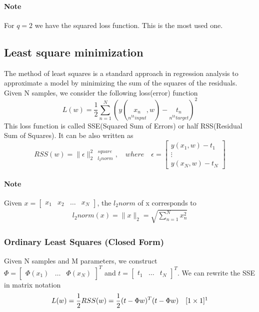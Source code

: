 \documentclass[../main.tex]{subfiles}
\begin{document}
\paragraph{Note} For $q=2$ we have the squared loss function. This is the most used one.

\subsection{Least square minimization}
The method of least squares is a standard approach in regression analysis to approximate a model by minimizing the sum of the squares of the residuals. Given N samples, we consider the following loss(error) function
\begin{equation}
    L(w)=\frac{1}{2}\sum_{n=1}^N(y(\underset{n^{th}input}{x_n},w)-\underset{n^{th}target}{t_n})^2
\end{equation}
This loss function is called SSE(Squared Sum of Errors) or half RSS(Residual Sum of Squares). It can be also written as
\begin{equation}
    RSS(w)=\|\epsilon\|_{2\quad l_2norm}^{2\quad square},\quad where \quad \epsilon=\begin{bmatrix}y(x_1,w)-t_1\\ \vdots \\ y(x_N,w)-t_N\end{bmatrix}
\end{equation}
\paragraph{Note} Given $x=\begin{bmatrix}x_1 & x_2 & \dots & x_{N}\end{bmatrix}$, the $l_2 norm$ of x corresponds to
\begin{align}
    l_2norm(x) = \|x\|_{2} = \sqrt{\sum_{n=1}^{N} x_n^2}
\end{align}

\newpage
\subsubsection{Ordinary Least Squares (Closed Form)}
Given N samples and M parameters, we construct $\Phi=\begin{bmatrix}\Phi(x_1) & \dots & \Phi(x_N)\end{bmatrix}^T$ and $t=\begin{bmatrix}t_1 & \dots & t_N\end{bmatrix}^T$.
\newline
We can rewrite the SSE in matrix notation
\begin{equation}
    L(w) = \frac{1}{2}RSS(w)=\frac{1}{2}(t-\Phi w)^T(t-\Phi w) \quad [1 \times 1]\footnotemark
\end{equation}
\end{document}
